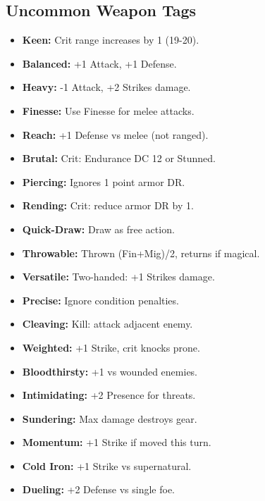 \documentclass[10pt,twoside]{article}
\begin{document}
\begin{multicols}{2}
\vspace{0.3cm}

\subsection{Uncommon Weapon Tags}
\begin{itemize}[leftmargin=0.2cm, itemsep=0.02cm, parsep=0pt]
\item \textcolor{uncommoncolor}{\textbf{Keen:}} Crit range increases by 1 (19-20).
\item \textcolor{uncommoncolor}{\textbf{Balanced:}} +1 Attack, +1 Defense.
\item \textcolor{uncommoncolor}{\textbf{Heavy:}} -1 Attack, +2 Strikes damage.
\item \textcolor{uncommoncolor}{\textbf{Finesse:}} Use Finesse for melee attacks.
\item \textcolor{uncommoncolor}{\textbf{Reach:}} +1 Defense vs melee (not ranged).
\item \textcolor{uncommoncolor}{\textbf{Brutal:}} Crit: Endurance DC 12 or Stunned.
\item \textcolor{uncommoncolor}{\textbf{Piercing:}} Ignores 1 point armor DR.
\item \textcolor{uncommoncolor}{\textbf{Rending:}} Crit: reduce armor DR by 1.
\item \textcolor{uncommoncolor}{\textbf{Quick-Draw:}} Draw as free action.
\item \textcolor{uncommoncolor}{\textbf{Throwable:}} Thrown (Fin+Mig)/2, returns if magical.
\item \textcolor{uncommoncolor}{\textbf{Versatile:}} Two-handed: +1 Strikes damage.
\item \textcolor{uncommoncolor}{\textbf{Precise:}} Ignore condition penalties.
\item \textcolor{uncommoncolor}{\textbf{Cleaving:}} Kill: attack adjacent enemy.
\item \textcolor{uncommoncolor}{\textbf{Weighted:}} +1 Strike, crit knocks prone.
\item \textcolor{uncommoncolor}{\textbf{Bloodthirsty:}} +1 vs wounded enemies.
\item \textcolor{uncommoncolor}{\textbf{Intimidating:}} +2 Presence for threats.
\item \textcolor{uncommoncolor}{\textbf{Sundering:}} Max damage destroys gear.
\item \textcolor{uncommoncolor}{\textbf{Momentum:}} +1 Strike if moved this turn.
\item \textcolor{uncommoncolor}{\textbf{Cold Iron:}} +1 Strike vs supernatural.
\item \textcolor{uncommoncolor}{\textbf{Dueling:}} +2 Defense vs single foe.
\end{itemize}


\end{multicols}
\end{document}
